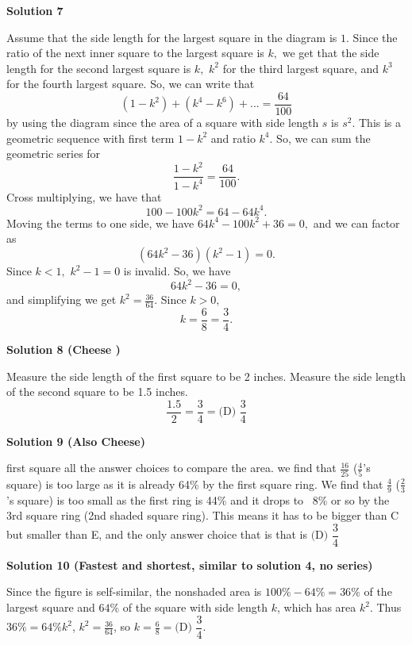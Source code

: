 \begin{enumerate}
 



\textbf{Solution 7}

Assume that the side length for the largest square in the diagram is $1.$ Since the ratio of the next inner square to the largest square is $k,$ we get that the side length for the second largest square is $k,$ $k^2$ for the third largest square, and $k^3$ for the fourth largest square. So, we can write that 
 \[(1-k^2)+(k^4-k^6)+...=\frac{64}{100}\] by using the diagram since the area of a square with side length $s$ is $s^2.$ This is a geometric sequence with first term $1-k^2$ and ratio $k^4.$ So, we can sum the geometric series for 
 \[\frac{1-k^2}{1-k^4}=\frac{64}{100}.\] Cross multiplying, we have that 
 \[100-100k^2=64-64k^4.\] Moving the terms to one side, we have $64k^4-100k^2+36=0,$ and we can factor as 
 \[(64k^2-36)(k^2-1)=0.\] Since $k<1,$ $k^2-1=0$ is invalid. So, we have 
 \[64k^2-36=0,\] and simplifying we get $k^2=\frac{36}{64}.$ Since $k>0,$ 
 \[k=\frac{6}{8}=\boxed{\frac{3}{4}}.\]




\textbf{Solution 8 (Cheese )}

Measure the side length of the first square to be 2 inches. Measure the side length of the second square to be 1.5 inches. 
 \[\frac{1.5}{2} = \frac{3}{4} = \boxed{\text{(D) } \frac{3}{4}}\]




\textbf{Solution 9 (Also Cheese)}

first square all the answer choices to compare the area. we find that $\frac{16}{25}$  ($\frac{4}{5}$'s square) is too large as it is already 64\% by the first square ring. We find that $\frac{4}{9}$  ($\frac{2}{3}$'s square) is too small as the first ring is 44\% and it drops to ~8\% or so by the 3rd square ring (2nd shaded square ring). This means it has to be bigger than C but smaller than E, and the only answer choice that is that is $\boxed{\text{(D) }\dfrac{3}{4}}$




\textbf{Solution 10 (Fastest and shortest, similar to solution 4, no series)}

Since the figure is self-similar, the nonshaded area is $100\%-64\% = 36\%$ of the largest square and $64\%$ of the square with side length $k$, which has area $k^2$. Thus $36\% = 64\%k^2$, $k^2 = \frac{36}{64}$, so $k = \frac{6}{8} = \boxed{\text{(D) }\dfrac{3}{4}}$.

 




\end{enumerate}
